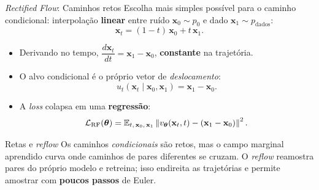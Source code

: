 \documentclass[aspectratio=169,xcolor=dvipsnames]{beamer}
\begin{document}
  \begin{frame}{\textit{Rectified Flow}: Caminhos retos}
    \small
    Escolha mais simples possível para o caminho condicional: interpolação
    \textbf{linear} entre ruído $\mathbf{x}_0 \sim p_0$ e dado
    $\mathbf{x}_1 \sim p_{\text{dados}}$:
    \vspace{-0.2em}
    \[
      \mathbf{x}_t = (1-t)\,\mathbf{x}_0 + t\,\mathbf{x}_1.
    \]
    \vspace{-0.3em}
    \begin{itemize}
      \item Derivando no tempo,
      $\dfrac{d \mathbf{x}_t}{dt} = \mathbf{x}_1 - \mathbf{x}_0$,
      \textbf{constante} na trajetória.
      \item O alvo condicional é o próprio vetor de \emph{deslocamento}:
      \vspace{-0.3em}
      \[
        u_t(\mathbf{x}_t \mid \mathbf{x}_0, \mathbf{x}_1) =
        \mathbf{x}_1 - \mathbf{x}_0.
      \]
      \item A \textit{loss} colapsa em uma \textbf{regressão}:
      \vspace{-0.4em}
      \[
        \mathcal{L}_{\text{RF}}(\bm{\theta}) =
        \mathbb{E}_{t,\, \mathbf{x}_0,\, \mathbf{x}_1}
        \left\| v_{\bm{\theta}}(\mathbf{x}_t, t) - (\mathbf{x}_1 - \mathbf{x}_0) \right\|^{2}.
      \]
    \end{itemize}
    \vspace{-0.3em}
    \begin{block}{Retas e \textit{reflow}}
      Os caminhos \emph{condicionais} são retos, mas o campo marginal
      aprendido curva onde caminhos de pares diferentes se cruzam. O
      \textit{reflow} reamostra pares do próprio modelo e retreina; isso
      endireita as trajetórias e permite amostrar com \textbf{poucos passos} de Euler.
    \end{block}
  \end{frame}
\end{document}
